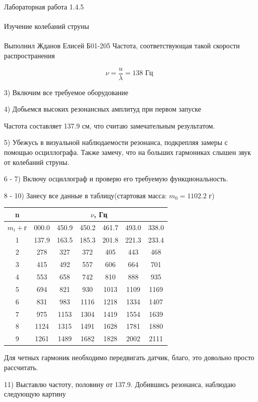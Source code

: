\documentclass{astroedu-lab}
\begin{document}
\begin{problem}{\huge Лабораторная работа 1.4.5\\\\Изучение колебаний струны\\\\Выполнил Жданов Елисей Б01-205}
Частота, соответствующая такой скорости распространения

\begin{equation}
	\nu = \frac{u}{\lambda} = 138 \text{ Гц}
\end{equation}

3) Включим все требуемое оборудование

4) Добьемся высоких резонансных амплитуд при первом запуске

Частота составляет 137.9 см, что считаю замечательным результатом.

5) Убежусь в визуальной наблюдаемости резонанса, подкрепляя замеры с помощью осциллографа. Также замечу, что на больших гармониках слышен звук от колебаний струны.

6 - 7) Включу осциллограф и проверю его требуемую функциональность.

8 - 10) Занесу все данные в таблицу(стартовая масса: $m_0 = 1102.2$ г)

\begin{center}
\begin{tabular}{|c|c|c|c|c|c|c|}
\hline n & \multicolumn{6}{|c|}{$\nu$, Гц} \\ \hline
$m_i+$г & 000.0 & 450.9 & 450.2 & 461.7 & 493.0 & 338.0	\\ \hline
1 & 137.9 & 163.5 	 & 185.3 & 201.8 & 221.3 & 233.4   	\\
2 & 278   & 327		 & 372   & 405   & 443   & 468  	\\
3 & 415   & 492 	 & 557   & 606   & 664   & 701  	\\
4 & 553   & 658		 & 742	 & 810	 & 888	 & 935		\\
5 & 694	  & 821   	 & 930   & 1013  & 1109  & 1169 	\\
6 & 831	  & 983	 	 & 1116	 & 1218	 & 1334	 & 1407		\\
7 & 975   & 1153	 & 1304	 & 1419	 & 1554	 & 1639		\\
8 & 1124  & 1315	 & 1491	 & 1628  & 1781	 & 1880		\\
9 & 1261  & 1489	 & 1682	 & 1828	 & 2002  & 2111		\\
\hline
\end{tabular}
\end{center}

Для четных гармоник необходимо передвигать датчик, благо, это довольно просто рассчитать.

11) Выставлю частоту, половину от 137.9. Добившись резонанса, наблюдаю следующую картину


\end{problem}
\end{document}
